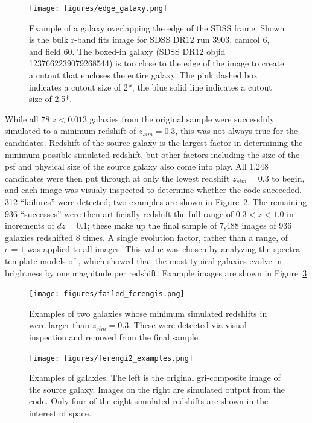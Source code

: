 \begin{figure}
\begin{center}
\texttt{[image: figures/edge\_galaxy.png]}
\caption{Example of a galaxy overlapping the edge of the SDSS frame. Shown is the bulk r-band fits image for SDSS DR12 run 3903, camcol 6, and field 60. The boxed-in galaxy (SDSS DR12 objid 1237662239079268544) is too close to the edge of the image to create a cutout that encloses the entire galaxy. The pink dashed box indicates a cutout size of 2*\radr, the blue solid line indicates a cutout size of 2.5*\radr. } 
\label{fig:edge_galaxy}
\end{center}
\end{figure}

While all 78 $z<0.013$ galaxies from the original \ferengi{} sample were successfuly simulated to a minimum redshift of $z_{sim}=0.3$, this was not always true for the  candidates. Redshift of the source galaxy is the largest factor in determining the minimum possible simulated redshift, but other factors including the size of the psf and physical size of the source galaxy also come into play. All 1,248 candidates were then put through \ferengi{} at only the lowest redshift $z_{sim}=0.3$ to begin, and each image was visualy inspected to determine whether the code succeeded. 312 ``failures'' were detected; two examples are shown in Figure~\ref{fig:ferengi_fails}. The remaining 936 ``successes'' were then artificially redshift the full range of $0.3<z<1.0$ in increments of $dz = 0.1$; these make up the final  sample of 7,488 images of 936 galaxies redshifted 8 times. A single evolution factor, rather than a range, of $e=1$ was applied to all images. This value was chosen by analyzing the spectra template models of \cite{Brinchmann2004a}, which showed that the most typical galaxies evolve in brightness by one magnitude per redshift. Example images are shown in Figure~\ref{fig:ferengi2_examples}


\begin{figure}
\begin{center}
\texttt{[image: figures/failed\_ferengis.png]}
\caption{Examples of two galaxies whose minimum simulated redshifts in \ferengi{} were larger than $z_{sim}=0.3$. These were detected via visual inspection and removed from the final  sample.} 
\label{fig:ferengi_fails}
\end{center}
\end{figure}


\begin{figure}
\centering
\texttt{[image: figures/ferengi2\_examples.png]}
\caption{Examples of  galaxies. The left is the original gri-composite image of the source galaxy. Images on the right are simulated output from the \ferengi{} code. Only four of the eight simulated redshifts are shown in the interest of space.} 
\label{fig:ferengi2_examples}
\end{figure}

